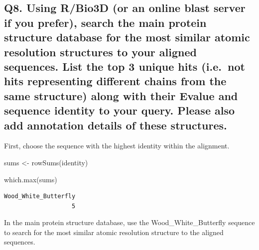 \documentclass[
  letterpaper,
  DIV=11,
  numbers=noendperiod]{scrartcl}
\newenvironment{Shaded}{\begin{snugshade}}{\end{snugshade}}
\newcommand{\FunctionTok}[1]{\textcolor[rgb]{0.28,0.35,0.67}{#1}}
\newcommand{\NormalTok}[1]{\textcolor[rgb]{0.00,0.23,0.31}{#1}}
\newcommand{\OtherTok}[1]{\textcolor[rgb]{0.00,0.23,0.31}{#1}}
\begin{document}
\hypertarget{q8.-using-rbio3d-or-an-online-blast-server-if-you-prefer-search-the-main-protein-structure-database-for-the-most-similar-atomic-resolution-structures-to-your-aligned-sequences.-list-the-top-3-unique-hits-i.e.-not-hits-representing-different-chains-from-the-same-structure-along-with-their-evalue-and-sequence-identity-to-your-query.-please-also-add-annotation-details-of-these-structures.}{%
\subsection{\texorpdfstring{Q8. \textbf{Using R/Bio3D (or an online
blast server if you prefer), search the main protein structure database
for the most similar atomic resolution structures to your aligned
sequences. List the top 3 unique hits (i.e.~not hits representing
different chains from the same structure) along with their Evalue and
sequence identity to your query. Please also add annotation details of
these
structures.}}{Q8. Using R/Bio3D (or an online blast server if you prefer), search the main protein structure database for the most similar atomic resolution structures to your aligned sequences. List the top 3 unique hits (i.e.~not hits representing different chains from the same structure) along with their Evalue and sequence identity to your query. Please also add annotation details of these structures.}}\label{q8.-using-rbio3d-or-an-online-blast-server-if-you-prefer-search-the-main-protein-structure-database-for-the-most-similar-atomic-resolution-structures-to-your-aligned-sequences.-list-the-top-3-unique-hits-i.e.-not-hits-representing-different-chains-from-the-same-structure-along-with-their-evalue-and-sequence-identity-to-your-query.-please-also-add-annotation-details-of-these-structures.}}

First, choose the sequence with the highest identity within the
alignment.

\begin{Shaded}
\begin{Highlighting}[]
\NormalTok{sums }\OtherTok{\textless{}{-}} \FunctionTok{rowSums}\NormalTok{(identity)}

\FunctionTok{which.max}\NormalTok{(sums)}
\end{Highlighting}
\end{Shaded}

\begin{verbatim}
Wood_White_Butterfly 
                   5 
\end{verbatim}

In the main protein structure database, use the Wood\_White\_Butterfly
sequence to search for the most similar atomic resolution structure to
the aligned sequences.
\end{document}

